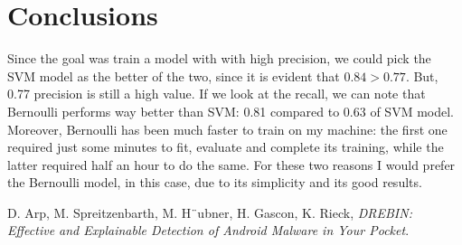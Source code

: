 \documentclass[12pt]{article}
\begin{document}
\section{Conclusions}
Since the goal was train a model with with high precision, we could pick the SVM model as the better of the two, since it is evident that $0.84 > 0.77$. But, 0.77 precision is still a high value. If we look at the recall, we can note that Bernoulli performs way better than SVM: 0.81 compared to 0.63 of SVM model. Moreover, Bernoulli has been much faster to train on my machine: the first one required just some minutes to fit, evaluate and complete its training, while the latter required half an hour to do the same. For these two reasons I would prefer the Bernoulli model, in this case, due to its simplicity and its good results. 

\begin{thebibliography}{10}
	
	D. Arp, M. Spreitzenbarth, M. H¨ubner, H. Gascon, K. Rieck, \textsl{DREBIN: Effective and Explainable Detection of Android Malware in Your Pocket}.
		
\end{thebibliography}
\end{document}
